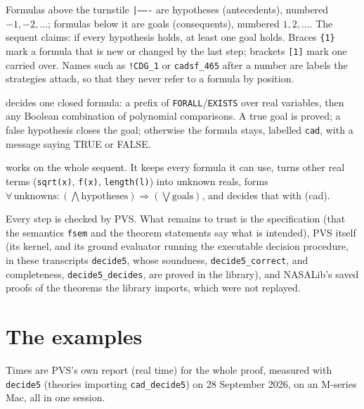 \documentclass[11pt]{article}
\begin{document}
\begin{description}[leftmargin=1.2em, style=nextline, itemsep=4pt]
\item[The sequent] Formulas above the turnstile \texttt{|-------} are hypotheses (antecedents), numbered $-1, -2, \dots$;
formulas below it are goals (consequents), numbered $1, 2, \dots$. The sequent claims: if every hypothesis holds, at least one goal holds.
Braces \texttt{\{1\}} mark a formula that is new or changed by the last step; brackets \texttt{[1]} mark one carried over.
Names such as \texttt{!CDG\_1} or \texttt{cadsf\_465} after a number are labels the strategies attach, so that they never refer to a formula by position.
\item[\texttt{(cad)}] decides one closed formula: a prefix of \texttt{FORALL}/\texttt{EXISTS} over real variables,
then any Boolean combination of polynomial comparisons. A true goal is proved; a false hypothesis closes the goal; otherwise the formula stays, labelled \texttt{cad}, with a message saying TRUE or FALSE.
\item[\texttt{(cad *)}] works on the whole sequent. It keeps every formula it can use, turns other real terms (\texttt{sqrt(x)}, \texttt{f(x)}, \texttt{length(l)}) into unknown reals,
forms $\forall\,\text{unknowns}\colon (\bigwedge\text{hypotheses}) \Rightarrow (\bigvee\text{goals})$, and decides that with (cad).
\item[What is trusted] Every step is checked by PVS. What remains to trust is the specification (that the semantics \texttt{fsem} and the theorem statements say what is intended), PVS itself (its kernel, and its ground evaluator running the executable decision procedure, in these transcripts \texttt{decide5}, whose soundness, \texttt{decide5\_correct}, and completeness, \texttt{decide5\_decides}, are proved in the library), and NASALib's saved proofs of the theorems the library imports, which were not replayed.
\end{description}

\clearpage
\section{The examples}
Times are PVS's own report (real time) for the whole proof, measured with \texttt{decide5} (theories importing
\texttt{cad\_decide5}) on 28 September 2026, on an M-series Mac, all in one session.
\end{document}
